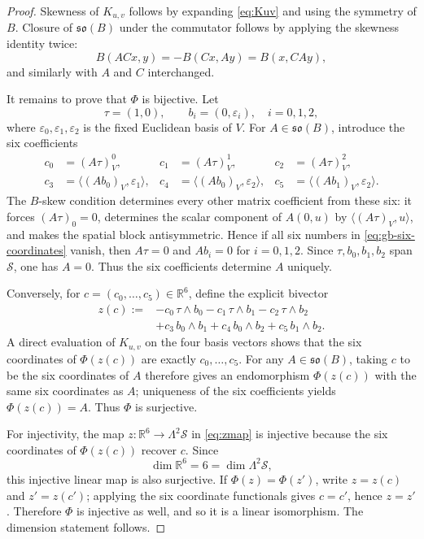 \documentclass[11pt,a4paper]{article}
\theoremstyle{definition}
\theoremstyle{remark}
\newcommand{\R}{\mathbb{R}}
\newcommand{\Smodel}{\mathcal{S}}
\newcommand{\soB}{\mathfrak{so}(B)}
\begin{document}
\begin{proof}
Skewness of \(K_{u,v}\) follows by expanding \eqref{eq:Kuv} and using the
symmetry of \(B\).  Closure of \(\soB\) under the commutator follows by
applying the skewness identity twice:
\[
  B(ACx,y)=-B(Cx,Ay)=B(x,CAy),
\]
and similarly with \(A\) and \(C\) interchanged.

It remains to prove that \(\Phi\) is bijective.  Let
\[
   \tau=(1,0),
   \qquad
   b_i=(0,\varepsilon_i),\quad i=0,1,2,
\]
where \(\varepsilon_0,\varepsilon_1,\varepsilon_2\) is the fixed Euclidean
basis of \(V\).  For \(A\in\soB\), introduce the six coefficients
\[
\begin{aligned}
   c_0&=(A\tau)_V^{0},&
   c_1&=(A\tau)_V^{1},&
   c_2&=(A\tau)_V^{2},\\
   c_3&=\langle (Ab_0)_V,\varepsilon_1\rangle,&
   c_4&=\langle (Ab_0)_V,\varepsilon_2\rangle,&
   c_5&=\langle (Ab_1)_V,\varepsilon_2\rangle.
\end{aligned}
\tag{4.6a}\label{eq:gb-six-coordinates}
\]
The \(B\)-skew condition determines every other matrix coefficient from
these six: it forces \((A\tau)_0=0\), determines the scalar component of
\(A(0,u)\) by \(\langle(A\tau)_V,u\rangle\), and makes the spatial block
antisymmetric.  Hence if all six numbers in
\eqref{eq:gb-six-coordinates} vanish, then \(A\tau=0\) and
\(Ab_i=0\) for \(i=0,1,2\).  Since \(\tau,b_0,b_1,b_2\) span
\(\Smodel\), one has \(A=0\).  Thus the six coefficients determine \(A\) uniquely.

Conversely, for \(c=(c_0,\ldots,c_5)\in\R^6\), define the explicit
bivector
\[
\begin{aligned}
   z(c):={}&-c_0\,\tau\wedge b_0
            -c_1\,\tau\wedge b_1
            -c_2\,\tau\wedge b_2\\
          &+c_3\,b_0\wedge b_1
            +c_4\,b_0\wedge b_2
            +c_5\,b_1\wedge b_2 .
\end{aligned}
\tag{4.6b}\label{eq:zmap}
\]
A direct evaluation of \(K_{u,v}\) on the four basis vectors shows that
the six coordinates of \(\Phi(z(c))\) are exactly \(c_0,\ldots,c_5\).
For any \(A\in\soB\), taking \(c\) to be the six coordinates of \(A\)
therefore gives an endomorphism \(\Phi(z(c))\) with the same six
coordinates as \(A\); uniqueness of the six coefficients yields \(\Phi(z(c))=A\).  Thus \(\Phi\) is
surjective.

For injectivity, the map \(z:\R^6\to\Lambda^2\Smodel\) in
\eqref{eq:zmap} is injective because the six coordinates of
\(\Phi(z(c))\) recover \(c\).  Since
\[
   \dim\R^6=6=\dim\Lambda^2\Smodel,
\]
this injective linear map is also surjective.  If \(\Phi(z)=\Phi(z')\),
write \(z=z(c)\) and \(z'=z(c')\); applying the six coordinate functionals
gives \(c=c'\), hence \(z=z'\).  Therefore \(\Phi\) is injective as well,
and so it is a linear isomorphism.  The dimension statement follows.
\end{proof}
\end{document}
